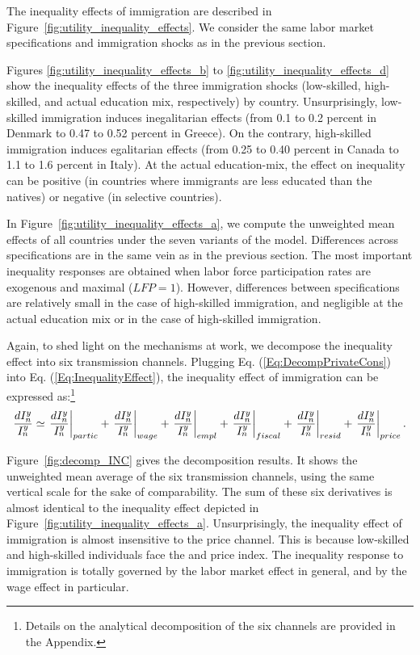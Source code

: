 \documentclass[a4paper,12pt]{article}
\begin{document}
The inequality effects of immigration are described in Figure~\ref{fig:utility_inequality_effects}. We consider the same labor market specifications and immigration shocks as in the previous section.

Figures \ref{fig:utility_inequality_effects_b} to \ref{fig:utility_inequality_effects_d} show the inequality effects of the three immigration shocks (low-skilled, high-skilled, and actual education mix, respectively) by country. Unsurprisingly, low-skilled immigration induces inegalitarian effects (from 0.1 to 0.2 percent in Denmark to 0.47 to 0.52 percent in Greece). On the contrary, high-skilled immigration induces egalitarian effects (from 0.25 to 0.40 percent in Canada to 1.1 to 1.6 percent in Italy). At the actual education-mix, the effect on inequality can be positive (in countries where immigrants are less educated than the natives) or negative (in selective countries).

In Figure~\ref{fig:utility_inequality_effects_a}, we compute the unweighted mean effects of all countries under the seven variants of the model. Differences across specifications are in the same vein as in the previous section. The most important inequality responses are obtained when labor force participation rates are exogenous and maximal ($LFP=1$). However, differences between specifications are relatively small in the case of high-skilled immigration, and negligible at the actual education mix or in the case of high-skilled immigration.

Again, to shed light on the mechanisms at work, we decompose the inequality effect into six transmission channels. Plugging Eq. (\ref{Eq:DecompPrivateCons}) into Eq. (\ref{Eq:InequalityEffect}), the inequality effect of immigration can be expressed as:\footnote{Details on the analytical decomposition of the six channels are provided in the Appendix.}
\begin{equation}
\frac{dI_{n}^{y}}{I_{n}^{y}}\simeq \left. \frac{dI_{n}^{y}}{I_{n}^{y}}%
\right \vert _{partic}+\left. \frac{dI_{n}^{y}}{I_{n}^{y}}\right \vert
_{wage}+\left. \frac{dI_{n}^{y}}{I_{n}^{y}}\right \vert _{empl}+\left. \frac{%
dI_{n}^{y}}{I_{n}^{y}}\right \vert _{fiscal}+\left. \frac{dI_{n}^{y}}{%
I_{n}^{y}}\right \vert _{resid}+\left. \frac{dI_{n}^{y}}{I_{n}^{y}}%
\right \vert _{price}. \label{Eq:DecompIneq}
\end{equation}

Figure~\ref{fig:decomp_INC} gives the decomposition results. It shows the unweighted mean average of the six transmission channels, using the same vertical scale for the sake of comparability. The sum of these six derivatives is almost identical to the inequality effect depicted in Figure~\ref{fig:utility_inequality_effects_a}. Unsurprisingly, the inequality effect of immigration is almost insensitive to the price channel. This is because low-skilled and high-skilled individuals face the and price index. The inequality response to immigration is totally governed by the labor market effect in general, and by the wage effect in particular.
\end{document}
